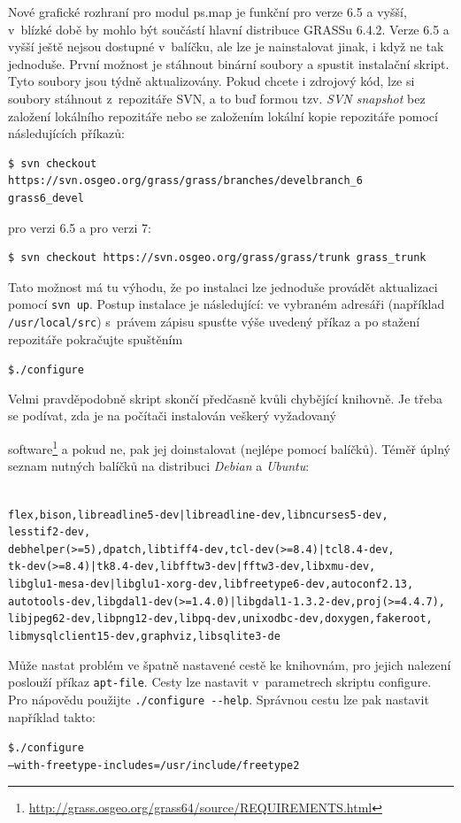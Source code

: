 \documentclass[a4paper,12pt,draft]{article}
\begin{document}
Nové grafické rozhraní pro modul ps.map je funkční pro verze 6.5
a vyšší, v~blízké době by mohlo být součástí hlavní distribuce GRASSu 6.4.2.
Verze 6.5 a vyšší ještě nejsou dostupné v~balíčku, ale lze je nainstalovat
jinak,
i když ne tak jednoduše. První možnost je stáhnout binární soubory  a
spustit instalační skript. Tyto soubory jsou týdně aktualizovány. Pokud
chcete i zdrojový kód, lze si soubory stáhnout z~repozitáře SVN, a to buď
formou tzv. \emph{SVN snapshot} bez založení lokálního repozitáře nebo
se založením lokální kopie repozitáře pomocí následujících příkazů:
\begin{footnotesize}
\begin{verbatim}
$ svn checkout https://svn.osgeo.org/grass/grass/branches/develbranch_6
grass6_devel
\end{verbatim}
\end{footnotesize}
pro verzi 6.5 a pro verzi 7:
\begin{footnotesize}
\begin{verbatim}
$ svn checkout https://svn.osgeo.org/grass/grass/trunk grass_trunk
\end{verbatim}
\end{footnotesize}
Tato možnost má tu výhodu, že po instalaci lze jednoduše provádět
aktualizaci pomocí \verb|svn up|. Postup instalace je následující: ve
vybraném adresáři (například \verb|/usr/local/src|) s~právem zápisu
spusťte výše uvedený příkaz a po stažení repozitáře pokračujte
spuštěním
\begin{alltt}
{\footnotesize \$ ./configure}
\end{alltt}
Velmi pravděpodobně skript skončí předčasně
kvůli chybějící knihovně. Je třeba se podívat,
zda je na počítači instalován veškerý vyžadovaný

software\footnote{\url{http://grass.osgeo.org/grass64/source/REQUIREMENTS.html}}
a pokud ne, pak jej doinstalovat (nejlépe pomocí balíčků). Téměř
úplný seznam nutných balíčků na distribuci \emph{Debian} a \emph{Ubuntu}:
\begin{alltt}
{\footnotesize
flex, bison, libreadline5-dev | libreadline-dev, libncurses5-dev,
lesstif2-dev,
debhelper (>= 5), dpatch, libtiff4-dev, tcl-dev (>= 8.4) | tcl8.4-dev,
tk-dev (>= 8.4) | tk8.4-dev, libfftw3-dev|fftw3-dev, libxmu-dev,
libglu1-mesa-dev | libglu1-xorg-dev, libfreetype6-dev, autoconf2.13,
autotools-dev, libgdal1-dev (>=1.4.0) | libgdal1-1.3.2-dev, proj (>= 4.4.7),
libjpeg62-dev, libpng12-dev, libpq-dev, unixodbc-dev, doxygen, fakeroot,
libmysqlclient15-dev, graphviz, libsqlite3-de
}
\end{alltt}
Může nastat problém ve špatně nastavené cestě ke knihovnám, pro
jejich nalezení poslouží příkaz \verb|apt-file|. Cesty lze nastavit
v~parametrech skriptu configure.
Pro nápovědu použijte \verb|./configure --help|.
Správnou cestu lze pak nastavit například takto:
\begin{alltt}
{\footnotesize \$ ./configure
--with-freetype-includes=/usr/include/freetype2
}
\end{alltt}
\end{document}
